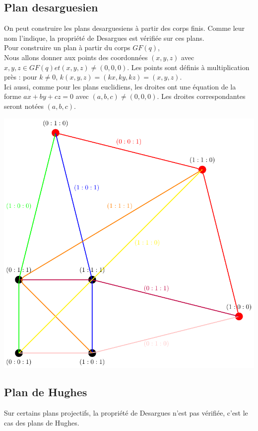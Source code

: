 \documentclass[a4paper]{article}
\begin{document}
\subsection{Plan desarguesien}
On peut construire les plans desarguesiens à partir des corps finis. Comme leur nom l'indique, la propriété de Desargues est vérifiée sur ces plans.\\
Pour construire un plan à partir du corps $GF(q)$,\\
Nous allons donner aux points des coordonnées $(x,y,z)$ avec $x,y,z \in GF(q) et (x,y,z) \neq (0,0,0)$. Les points sont définis à multiplication près : pour $k \neq 0$, $k(x,y,z) = (kx,ky,kz) = (x,y,z)$.\\
Ici aussi, comme pour les plans euclidiens, les droites ont une équation de la forme $ax + by + cz = 0$ avec $(a,b,c) \neq (0,0,0)$. Les droites correspondantes seront notées $(a,b,c)$.
\begin{center}
  \includegraphics[scale=0.5]{droitestikz.pdf}
  \end{center}
\vspace{2\baselineskip}
\subsection{Plan de Hughes}
Sur certains plans projectifs, la propriété de Desargues n'est pas vérifiée, c'est le cas des plans de Hughes.\vspace{1\baselineskip}\\
\end{document}
